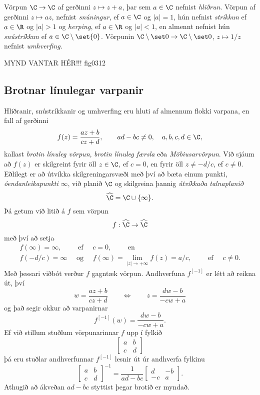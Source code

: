 Vörpun $\C\to \C$ af gerðinni $z\mapsto z+a$, þar sem 
$a\in \C$ nefnist {\it hliðrun}.
Vörpun af gerðinni $z\mapsto az$, nefnist
{\it snúningur}, ef $a\in
\C$ og  $|a|=1$, hún nefnist {\it
stríkkun} ef $a\in
\R$ og $|a|>1$ og {\it herping}, ef  
$a\in \R$ og $|a|<1$, en almennt nefnist hún
{\it snústríkkun} ef $a\in \C\setminus\set{0}$.
Vörpunin $\C\setminus\set 0 \to \C\setminus\set 0$, 
$z\mapsto 1/z$ nefnist {\it
umhverfing}.

\bigskip
MYND VANTAR HÉR!!! {fig0312}{}


\subsection*{Brotnar línulegar varpanir}

Hliðranir, snústríkkanir og umhverfing eru hluti af almennum flokki
varpana, en fall af gerðinni 
 $$f(z)=\dfrac{az+b}{cz+d}, \qquad ad-bc\neq 0, \quad a,b,c,d\in \C,
 $$
kallast {\it brotin línuleg vörpun},
{\it brotin línuleg færsla}
eða {\it Möbiusarvörpun}.  Við
sjáum að $f(z)$  er skilgreint fyrir öll $z\in \C$,  ef $c=0$, en fyrir
öll $z\neq -d/c$, ef $c\neq 0$.  
Eðlilegt er að útvíkka
skilgreningarsvæði með því að bæta einum punkti, {\it
óendanleikapunkti}   $\infty$, 
við planið $\C$ og skilgreina þannig {\it útvíkkaða talnaplanið}
$$
\widehat \C=\C\cup \{\infty\}.
$$
Þá getum við litið á $f$ sem vörpun
 $$f:\widehat \C \to \widehat \C
 $$
með því að setja
\begin{gather*}
f(\infty)=\infty, \qquad \text{ ef } \quad c=0, \qquad \text{ en }\\
f(-d/c)=\infty \quad \text{ og } \quad f(\infty)=\lim_{|z|\to+\infty}f(z)=a/c, \qquad
\text{ ef } \quad c\neq 0.
\end{gather*}
Með þessari viðbót verður $f$ gagntæk vörpun.  
Andhverfuna $f^{[-1]}$ er létt að
reikna út, því
 $$w=\dfrac{az+b}{cz+d} \qquad \Leftrightarrow \qquad
z=\dfrac{dw-b}{-cw+a}
 $$
og það  segir okkur að varpanirnar 
$$
f^{[-1]}(w)=\dfrac{dw-b}{-cw+a}.
$$
Ef við stillum stuðlum vörpunarinnar $f$ upp í fylkið
$$
\left[\begin{matrix} a&b\\c&d\end{matrix}\right]
$$
þá eru stuðlar andhverfunnar $f^{[-1]}$ lesnir út úr andhverfa fylkinu 
 $$\left[\begin{matrix} a&b\\c&d\end{matrix}\right]^{-1}=
\dfrac 1{ad-bc}\left[\begin{matrix} d&-b\\-c&a\end{matrix}\right].
 $$
Athugið að ákveðan $ad-bc$ styttist þegar brotið er myndað.


